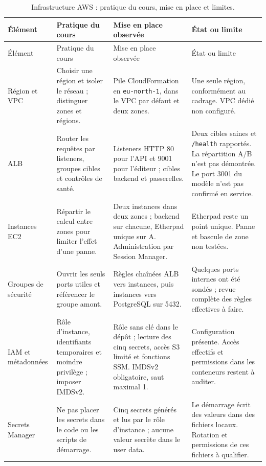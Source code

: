 \begingroup\small\sloppy
\setlength{\tabcolsep}{0pt}
\begin{longtable}{@{}L{22mm}@{\hspace{1mm}}L{31mm}@{\hspace{1mm}}L{50mm}@{\hspace{1mm}}L{51mm}@{}}
\caption{Infrastructure AWS : pratique du cours, mise en place et limites.}\label{tab:aws-controles}\\
\toprule Élément & Pratique du cours & Mise en place observée & État ou limite \\
\midrule\endfirsthead
\toprule Élément & Pratique du cours & Mise en place observée & État ou limite \\
\midrule\endhead
Région et VPC & Choisir une région et isoler le réseau ; distinguer zones et régions. \cite[p.~14, 41]{cours-aws} & Pile CloudFormation en \texttt{eu-north-1}, dans le VPC par défaut et deux zones. & Une seule région, conformément au cadrage. VPC dédié non configuré. \\
\addlinespace
ALB & Router les requêtes par listeners, groupes cibles et contrôles de santé. \cite[p.~107]{cours-aws} & Listeners HTTP 80 pour l'API et 9001 pour l'éditeur ; cibles backend et passerelles. & Deux cibles saines et \texttt{/health} rapportés. La répartition A/B n'est pas démontrée. Le port 3001 du modèle n'est pas confirmé en service. \\
\addlinespace
Instances EC2 & Répartir le calcul entre zones pour limiter l'effet d'une panne. \cite[p.~16]{cours-aws} & Deux instances dans deux zones ; backend sur chacune, Etherpad unique sur A. Administration par Session Manager. & Etherpad reste un point unique. Panne et bascule de zone non testées. \\
\addlinespace
Groupes de sécurité & Ouvrir les seuls ports utiles et référencer le groupe amont. \cite[p.~45, 48]{cours-aws} & Règles chaînées ALB vers instances, puis instances vers PostgreSQL sur 5432. & Quelques ports internes ont été sondés ; revue complète des règles effectives à faire. \\
\addlinespace
IAM et métadonnées & Rôle d'instance, identifiants temporaires et moindre privilège ; imposer IMDSv2. \cite[p.~32, 38--39, 66]{cours-aws} & Rôle sans clé dans le dépôt ; lecture des cinq secrets, accès S3 limité et fonctions SSM. IMDSv2 obligatoire, saut maximal 1. & Configuration présente. Accès effectifs et permissions dans les conteneurs restent à auditer. \\
\addlinespace
Secrets Manager & Ne pas placer les secrets dans le code ou les scripts de démarrage. \cite[p.~38--39]{cours-aws} & Cinq secrets générés et lus par le rôle d'instance ; aucune valeur secrète dans le user data. & Le démarrage écrit des valeurs dans des fichiers locaux. Rotation et permissions de ces fichiers à qualifier. \\

\end{longtable}
